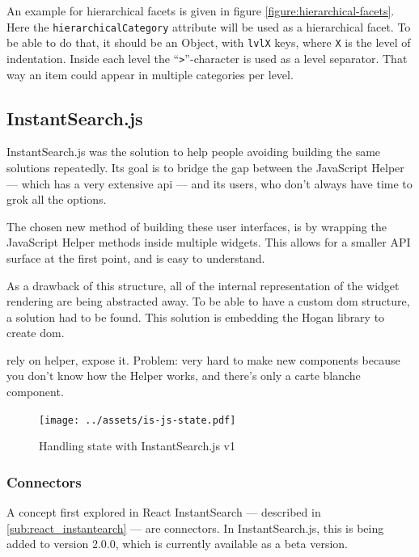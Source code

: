 An example for hierarchical facets is given in figure \ref{figure:hierarchical-facets}. Here the {\tt hierarchicalCategory} \gls{attribute} will be used as a hierarchical facet. To be able to do that, it should be an Object, with {\tt lvlX} keys, where {\tt X} is the level of indentation. Inside each level the ``{\tt >}''-character is used as a level separator. That way an item could appear in multiple categories per level.


\subsection{InstantSearch.js} %
\label{sub:instantsearch_js}

InstantSearch.js was the solution to help people avoiding building the same solutions repeatedly. Its goal is to bridge the gap between the JavaScript Helper --- which has a very extensive \acrshort{api} --- and its users, who don't always have time to \gls{grok} all the options.

The chosen new method of building these user interfaces, is by wrapping the JavaScript Helper methods inside multiple widgets. This allows for a smaller API surface at the first point, and is easy to understand.

As a drawback of this structure, all of the internal representation of the widget rendering are being abstracted away. To be able to have a custom \acrshort{dom} structure, a solution had to be found. This solution is embedding the Hogan library to create \acrshort{dom}.

rely on helper, expose it. Problem: very hard to make new components because you don't know how the Helper works, and there's only a carte blanche component. %

\begin{figure}[H]
  \centering
  \texttt{[image: ../assets/is-js-state.pdf]}
  \caption{Handling state with InstantSearch.js v1}
  \label{figure:is-js-state}
\end{figure}

\subsubsection{Connectors} %
\label{ssub:instantsearch_js_connectors}

A concept first explored in React InstantSearch --- described in \ref{sub:react_instantearch} --- are connectors. In InstantSearch.js, this is being added to version 2.0.0, which is currently available as a beta version. 

